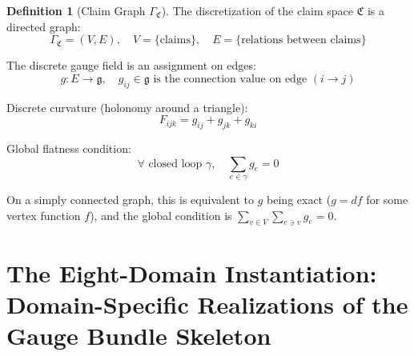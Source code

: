 \documentclass[12pt,a4paper]{article}
\theoremstyle{plain}
\theoremstyle{definition}
\newtheorem{definition}[theorem]{Definition}
\newcommand{\Lie}{\mathfrak{g}}
\newcommand{\ClaimSpace}{\mathfrak{C}}
\begin{document}
\begin{definition}[Claim Graph $\Gamma_{\ClaimSpace}$]
The discretization of the claim space $\ClaimSpace$ is a directed graph:
\begin{equation}
    \Gamma_{\ClaimSpace} = (V, E), \quad V = \{\text{claims}\}, \quad E = \{\text{relations between claims}\}
\end{equation}

The discrete gauge field is an assignment on edges:
\begin{equation}
    g: E \to \Lie, \quad g_{ij} \in \Lie \text{ is the connection value on edge } (i \to j)
\end{equation}

Discrete curvature (holonomy around a triangle):
\begin{equation}
    F_{ijk} = g_{ij} + g_{jk} + g_{ki}
\end{equation}

Global flatness condition:
\begin{equation}
    \forall \text{ closed loop } \gamma, \quad \sum_{e \in \gamma} g_e = 0
\end{equation}

On a simply connected graph, this is equivalent to $g$ being exact ($g = df$ for some vertex function $f$), and the global condition is $\sum_{v \in V} \sum_{e \ni v} g_e = 0$.
\end{definition}

\newpage


\part{The Eight-Domain Instantiation: Domain-Specific Realizations of the Gauge Bundle Skeleton}

\vspace{0.5cm}
\end{document}
